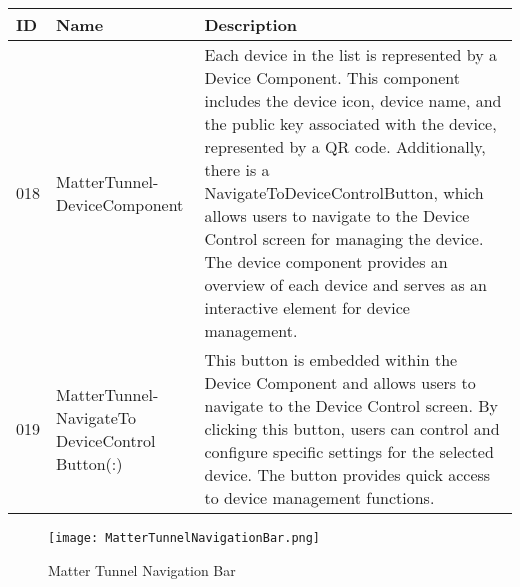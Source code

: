 \documentclass[conference]{IEEEtran}
\begin{document}
\begin{enumerate}[itemsep=2ex, parsep=1ex]
\begin{enumerate}[itemsep=2ex, parsep=1ex]
	      	      \begin{table}[h!]
	      	      	\def\arraystretch{1.24} \small
	      	      	\begin{tabular}{|p{1.2cm}|p{2.5cm}|p{4.0cm}|}
	      	      		\hline
	      	      		ID  & Name                                            & Description                                                                                                                                                                                                                                                                                                                                                                                                                                                    \\
	      	      		\hline
	      	      		018 & MatterTunnel-DeviceComponent                    & Each device in the list is represented by a Device Component. This component includes the device icon, device name, and the public key associated with the device, represented by a QR code. Additionally, there is a NavigateToDeviceControlButton, which allows users to navigate to the Device Control screen for managing the device. The device component provides an overview of each device and serves as an interactive element for device management. \\
	      	      		\hline
	      	      		019 & MatterTunnel-NavigateTo DeviceControl Button(:) & This button is embedded within the Device Component and allows users to navigate to the Device Control screen. By clicking this button, users can control and configure specific settings for the selected device. The button provides quick access to device management functions.                                                                                                                                                                            \\
	      	      		\hline
	      	      	\end{tabular}
	      	      \end{table}
                  
	      	      \begin{figure}[h!]
	      	      	\centering
	      	      	\texttt{[image: MatterTunnelNavigationBar.png]}
	      	      	\caption{Matter Tunnel Navigation Bar}
	      	      	\label{fig:enter-label}
	      	      \end{figure}

                  \vspace{10cm}
	      	      	      	      

\end{enumerate}
\end{enumerate}
\end{document}
